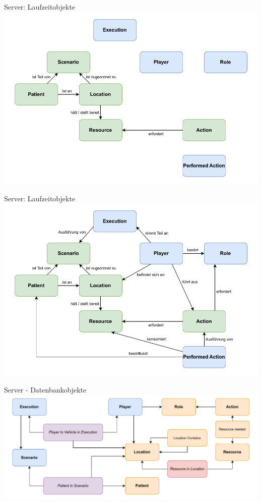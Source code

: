 \begin{frame}[noframenumbering]{Server: Laufzeitobjekte}
	\centering
	\includegraphics[height=.9\textheight]{images/server/laufzeit_objekte_3.pdf}
\end{frame}

\begin{frame}[noframenumbering]{Server: Laufzeitobjekte}
	\centering
	\includegraphics[height=.9\textheight]{images/server/laufzeit_objekte.pdf}
\end{frame}


\begin{frame}{Server - Datenbankobjekte}
	\centering
	\includegraphics[width=\textwidth]{images/server/datenbank_objekte.pdf}
\end{frame}
